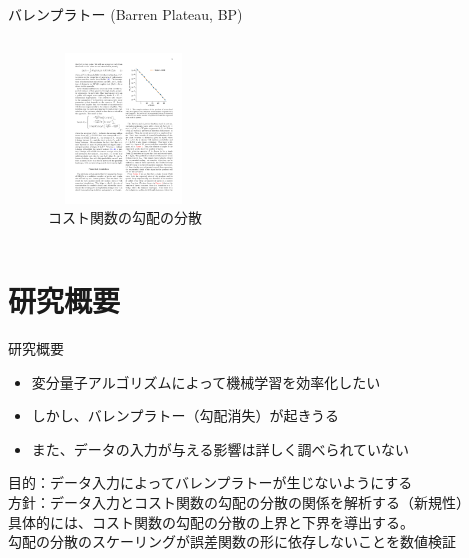 \documentclass[dvipdfmx,10pt,aspectratio=169]{beamer}
\begin{document}
\begin{frame}{バレンプラトー (Barren Plateau, BP)}
\begin{columns}
\begin{column}{0.35\textwidth}
            \begin{figure}
                \centering
                \includegraphics[height=4cm,width=4cm]{bp-var.pdf}
                \vspace*{-5pt}
                \caption{コスト関数の勾配の分散}
            \end{figure}
        \end{column}
    \end{columns}
\end{frame}




\section{研究概要}
\begin{frame}{研究概要}

    \vspace*{-20pt}
    \begin{center}
        {\large\colorbox{blue!40}{}}
    \end{center}
    \begin{center}
        \begin{minipage}{0.8\textwidth}
            \begin{itemize}
                \item 変分量子アルゴリズムによって機械学習を効率化したい
                \item しかし、バレンプラトー（勾配消失）が起きうる
                \item また、データの入力が与える影響は詳しく調べられていない
            \end{itemize}
        \end{minipage}
    \end{center}

    \begin{center}
        {\large\colorbox{blue!40}{}}
    \end{center}

    目的：データ入力によってバレンプラトーが生じないようにする\\
    \vspace*{5pt}
    方針：データ入力とコスト関数の勾配の分散の関係を解析する（新規性）\\\hspace*{46pt}具体的には、コスト関数の勾配の分散の上界と下界を導出する。\\
    \vspace*{5pt}
    \hspace*{29pt}勾配の分散のスケーリングが誤差関数の形に依存しないことを数値検証
\end{frame}
\end{document}
